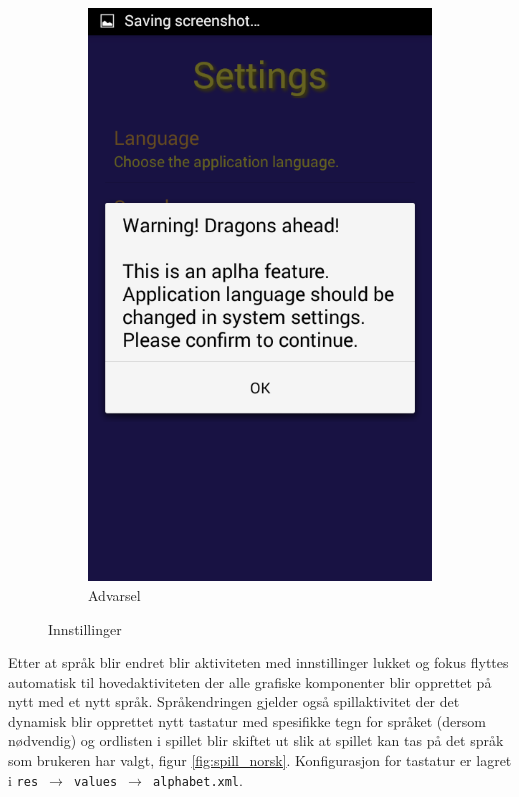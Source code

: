 \begin{figure}[ht]
\begin{subfigure}[b]{0.25\textwidth}
        \includegraphics[width=\textwidth]{./img/bruksanvisning/9.png}
        \caption{Advarsel}
        \label{fig:innstillinger_advarsel}
    \end{subfigure}
    \caption{Innstillinger}\label{fig:innstillinger}
\end{figure}

Etter at språk blir endret blir aktiviteten med innstillinger lukket og fokus flyttes automatisk til hovedaktiviteten der alle grafiske komponenter blir opprettet på nytt med et nytt språk. Språkendringen gjelder også spillaktivitet der det dynamisk blir opprettet nytt tastatur med spesifikke tegn for språket (dersom nødvendig) og ordlisten i spillet blir skiftet ut slik at spillet kan tas på det språk som brukeren har valgt, figur \ref{fig:spill_norsk}. Konfigurasjon for tastatur er lagret i \texttt{res $\rightarrow$ values $\rightarrow$ alphabet.xml}.

